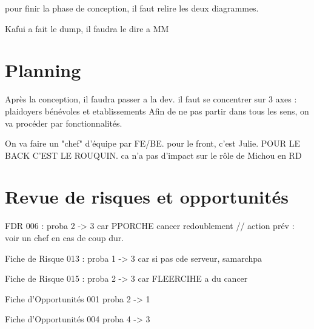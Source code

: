 \documentclass [a4paper] {article}
\begin{document}
pour finir la phase de conception, il faut relire les deux diagrammes.


Kafui a fait le dump, il faudra le dire a MM


\section{Planning}
Après la conception, il faudra passer a la dev. il faut se concentrer sur 3 axes : plaidoyers bénévoles et etablissements
Afin de ne pas partir dans tous les sens, on va procéder par fonctionnalités.

On va faire un "chef" d'équipe par FE/BE. pour le front, c'est Julie. POUR LE BACK C'EST LE ROUQUIN. ca n'a pas d'impact sur le rôle de Michou en RD


\section{Revue de risques et opportunités}

FDR 006 : proba 2 -> 3 car PPORCHE cancer redoublement   //   action prév : voir un chef en cas de coup dur. 

Fiche de Risque 013 : proba 1 -> 3 car si pas cde serveur, samarchpa


Fiche de Risque 015 : proba 2 -> 3 car FLEERCIHE a du cancer

Fiche d’Opportunités 001 proba 2 -> 1 

Fiche d’Opportunités 004 proba 4 -> 3

 



\end{document}
